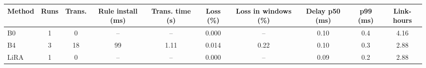 \begin{tabular}{@{}lccccccccc@{}}
\toprule
Method & Runs & Trans. & Rule install (ms) & Trans. time (s) & Loss (\%) & Loss in windows (\%) & Delay p50 (ms) & p99 (ms) & Link-hours \\
\midrule
B0 & 1 & 0 & -- & -- & 0.000 & -- & 0.10 & 0.4 & 4.16 \\
B4 & 3 & 18 & 99 & 1.11 & 0.014 & 0.22 & 0.10 & 0.3 & 2.88 \\
LiRA & 1 & 0 & -- & -- & 0.000 & -- & 0.09 & 0.2 & 2.88 \\
\bottomrule
\end{tabular}
